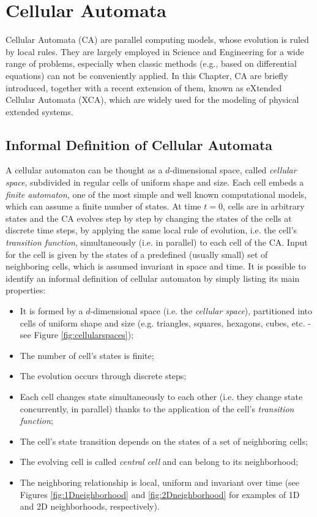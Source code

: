 \chapter{Cellular Automata}\label{ch:CA}

Cellular Automata (CA) are parallel computing models, whose evolution
is ruled by local rules. They are largely employed in Science and
Engineering for a wide range of problems, especially when classic
methods (e.g., based on differential equations) can not be conveniently
applied. In this Chapter, CA are briefly introduced, together with a
recent extension of them, known as eXtended Cellular Automata (XCA),
which are widely used for the modeling of physical extended systems.


\section{Informal Definition of Cellular Automata}\label{sec:CAInformaDef}

A cellular automaton can be thought as a $d$-dimensional space, called
\emph{cellular space}, subdivided in regular cells of uniform shape
and size. Each cell embeds a \emph{finite automaton}, one of the most
simple and well known computational models, which can assume a finite
number of states. At time $t=0$, cells are in arbitrary states and the
CA evolves step by step by changing the states of the cells at
discrete time steps, by applying the same local rule of evolution,
i.e. the cell's \emph{transition function}, simultaneously (i.e. in
parallel) to each cell of the CA. Input for the cell is given by the
states of a predefined (usually small) set of neighboring cells, which
is assumed invariant in space and time. It is possible to identify an
informal definition of cellular automaton by simply listing its main
properties:

\begin{itemize}
\item It is formed by a $d$-dimensional space (i.e. the \emph{cellular
  space}), partitioned into cells of uniform shape and size
  (e.g. triangles, squares, hexagons, cubes, etc. - see Figure
  \ref{fig:cellularspaces});
\item The number of cell's states is finite;
\item The evolution occurs through discrete steps;
\item Each cell changes state simultaneously to each other (i.e. they
  change state concurrently, in parallel) thanks to the application of
  the cell's \emph{transition function};
\item The cell's state transition depends on the states of a set of neighboring cells;
\item The evolving cell is called \emph{central cell} and can belong
  to its neighborhood;
\item The neighboring relationship is local, uniform and invariant
  over time (see Figures \ref{fig:1Dneighborhood} and
  \ref{fig:2Dneighborhood} for examples of 1D and 2D neighborhoods,
  respectively).
\end{itemize}

